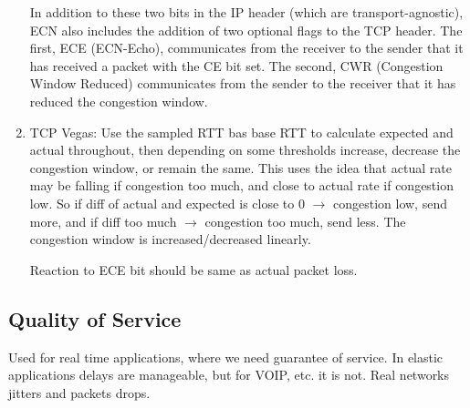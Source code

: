 \documentclass[12pt]{book}
\begin{document}
\begin{enumerate}
    In addition to these two bits in the IP header (which are transport-agnostic), ECN also includes the addition of two optional flags to the TCP header. The first, ECE (ECN-Echo), communicates from the receiver to the sender that it has received a packet with the CE bit set. The second, CWR (Congestion Window Reduced) communicates from the sender to the receiver that it has reduced the congestion window.
    \item TCP Vegas: Use the sampled RTT bas base RTT to calculate expected and actual throughout, then depending on some thresholds increase, decrease the congestion window, or remain the same. This uses the idea that actual rate may be falling if congestion too much, and close to actual rate if congestion low. So if diff of actual and expected is close to 0 $\to$ congestion low, send more, and if diff too much $\to$ congestion too much, send less. The congestion window is increased/decreased linearly.
    
    Reaction to ECE bit should be same as actual packet loss.
\end{enumerate}

\subsection{Quality of Service}
Used for real time applications, where we need guarantee of service. In elastic applications delays are manageable, but for VOIP, etc. it is not. Real networks jitters and packets drops.
\end{document}
